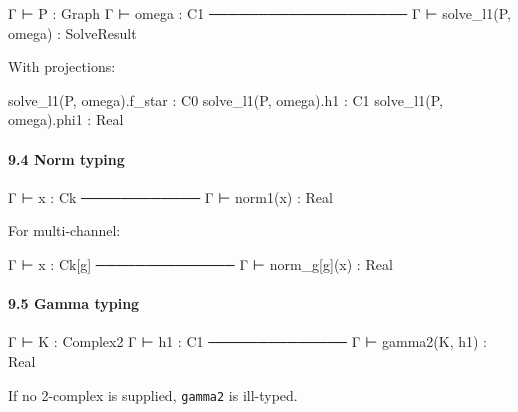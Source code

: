 \documentclass[
]{article}
\newenvironment{Shaded}{\begin{snugshade}}{\end{snugshade}}
\newcommand{\NormalTok}[1]{\textcolor[rgb]{0.12,0.11,0.11}{#1}}
\begin{document}
\begin{Shaded}
\begin{Highlighting}[]
\NormalTok{Γ ⊢ P     : Graph}
\NormalTok{Γ ⊢ omega : C1}
\NormalTok{────────────────────}
\NormalTok{Γ ⊢ solve\_l1(P, omega) : SolveResult}
\end{Highlighting}
\end{Shaded}

With projections:

\begin{Shaded}
\begin{Highlighting}[]
\NormalTok{solve\_l1(P, omega).f\_star : C0}
\NormalTok{solve\_l1(P, omega).h1     : C1}
\NormalTok{solve\_l1(P, omega).phi1   : Real}
\end{Highlighting}
\end{Shaded}

\paragraph{9.4 Norm typing}\label{norm-typing}

\begin{Shaded}
\begin{Highlighting}[]
\NormalTok{Γ ⊢ x : Ck}
\NormalTok{────────────}
\NormalTok{Γ ⊢ norm1(x) : Real}
\end{Highlighting}
\end{Shaded}

For multi-channel:

\begin{Shaded}
\begin{Highlighting}[]
\NormalTok{Γ ⊢ x : Ck[g]}
\NormalTok{──────────────}
\NormalTok{Γ ⊢ norm\_g[g](x) : Real}
\end{Highlighting}
\end{Shaded}

\paragraph{9.5 Gamma typing}\label{gamma-typing}

\begin{Shaded}
\begin{Highlighting}[]
\NormalTok{Γ ⊢ K  : Complex2}
\NormalTok{Γ ⊢ h1 : C1}
\NormalTok{──────────────}
\NormalTok{Γ ⊢ gamma2(K, h1) : Real}
\end{Highlighting}
\end{Shaded}

If no 2-complex is supplied, \texttt{gamma2} is ill-typed.
\end{document}
